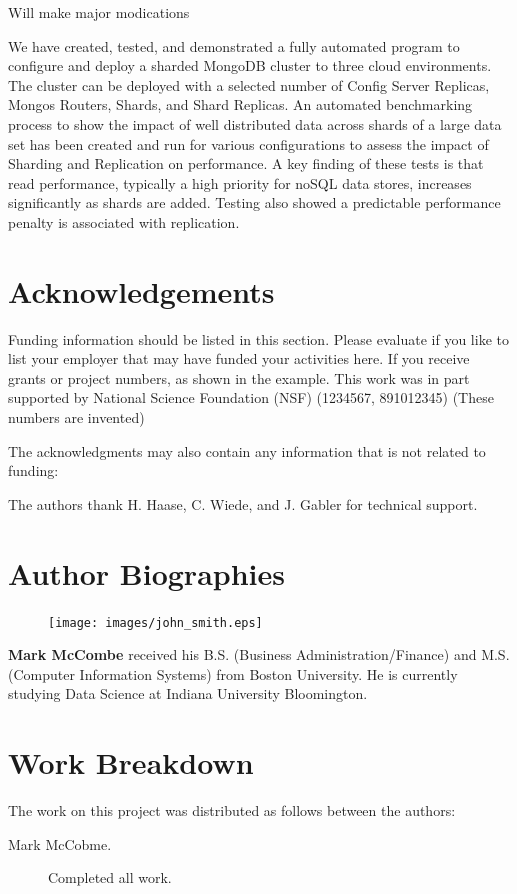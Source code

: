 \documentclass[9pt,twocolumn,twoside]{styles/osajnl}
\begin{document}
Will make major modications

We have created, tested, and demonstrated a fully automated program to configure and deploy a sharded MongoDB cluster to three cloud environments.  The cluster can be deployed with a selected number of Config Server Replicas, Mongos Routers, Shards, and Shard Replicas.  An automated benchmarking process to show the impact of well distributed data across shards of a large data set has been created and run for various configurations to assess the impact of Sharding and Replication on performance.  A key finding of these tests is that read performance, typically a high priority for noSQL data stores, increases significantly as shards are added.  Testing also showed a predictable performance penalty is associated with replication.




\section*{Acknowledgements}

Funding information should be listed in this section. Please evaluate
if you like to list your employer that may have funded your activities
here.  If you receive grants or project numbers, as shown in the
example.  This work was in part supported by National Science
Foundation (NSF) (1234567, 891012345) (These numbers are invented)

The acknowledgments may also contain any information that is not
related to funding:

The authors thank H. Haase, C. Wiede, and J. Gabler for technical
support.




 
\section*{Author Biographies}
\begingroup
\setlength\intextsep{0pt}
\begin{minipage}[t][3.2cm][t]{1.0\columnwidth} %
  \begin{figure}
    \texttt{[image: images/john\_smith.eps]}
  \end{figure}
  \noindent
{\bfseries Mark McCombe} received his B.S. (Business Administration/Finance) and M.S. (Computer Information Systems) from Boston University.  He is currently studying Data Science at Indiana University Bloomington.

\end{minipage}
\endgroup

\newpage

\appendix

\section{Work Breakdown}

The work on this project was distributed as follows between the
authors:

\begin{description}

\item[Mark McCobme.] Completed all work.

\end{description}
\end{document}
